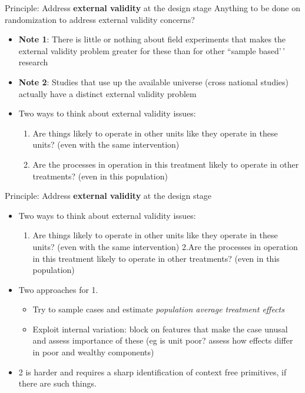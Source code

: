 \documentclass[
  11pt,
  ignorenonframetext,
]{beamer}
\providecommand{\tightlist}{%
  \setlength{\itemsep}{0pt}\setlength{\parskip}{0pt}}\usepackage{longtable,booktabs,array}
\begin{document}
\begin{frame}{Principle: Address \textbf{external validity} at the
design stage}
\protect\hypertarget{principle-address-external-validity-at-the-design-stage}{}
Anything to be done on randomization to address external validity
concerns?

\begin{itemize}
\tightlist
\item
  \textbf{Note 1}: There is little or nothing about field experiments
  that makes the external validity problem greater for these than for
  other ``sample based'\,' research
\item
  \textbf{Note 2}: Studies that use up the available universe (cross
  national studies) actually have a distinct external validity problem
\item
  Two ways to think about external validity issues:

  \begin{enumerate}
  \tightlist
  \item
    Are things likely to operate in other units like they operate in
    these units? (even with the same intervention)
  \item
    Are the processes in operation in this treatment likely to operate
    in other treatments? (even in this population)
  \end{enumerate}
\end{itemize}
\end{frame}

\begin{frame}{Principle: Address \textbf{external validity} at the
design stage}
\protect\hypertarget{principle-address-at-the-design-stage}{}
\begin{itemize}
\tightlist
\item
  Two ways to think about external validity issues:

  \begin{enumerate}
  \tightlist
  \item
    Are things likely to operate in other units like they operate in
    these units? (even with the same intervention) 2.Are the processes
    in operation in this treatment likely to operate in other
    treatments? (even in this population)
  \end{enumerate}
\item
  Two approaches for 1.

  \begin{itemize}
  \tightlist
  \item
    Try to sample cases and estimate
    \textit{population average treatment effects}
  \item
    Exploit internal variation: block on features that make the case
    unusal and assess importance of these (eg is unit poor? assess how
    effects differ in poor and wealthy components)
  \end{itemize}
\item
  2 is harder and requires a sharp identification of context free
  primitives, if there are such things.
\end{itemize}
\end{frame}
\end{document}
